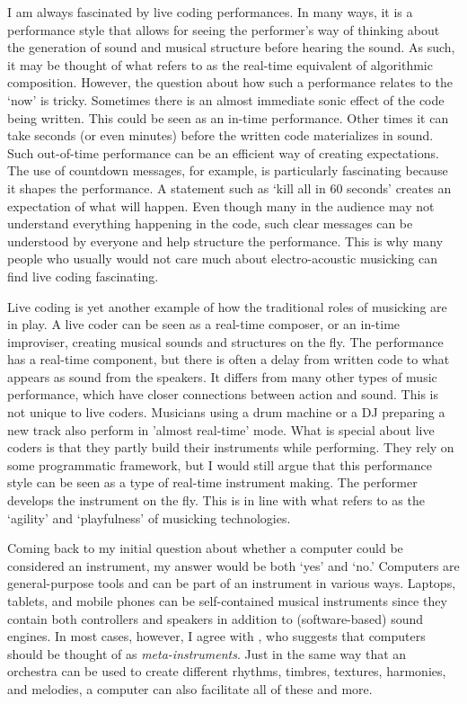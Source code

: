 I am always fascinated by live coding performances. In many ways, it is a performance style that allows for seeing the performer's way of thinking about the generation of sound and musical structure before hearing the sound. As such, it may be thought of what \citet{chadabe_electric_1997} refers to as the real-time equivalent of algorithmic composition. However, the question about how such a performance relates to the `now' is tricky. Sometimes there is an almost immediate sonic effect of the code being written. This could be seen as an in-time performance. Other times it can take seconds (or even minutes) before the written code materializes in sound. Such out-of-time performance can be an efficient way of creating expectations. The use of countdown messages, for example, is particularly fascinating because it shapes the performance. A statement such as `kill all in 60 seconds' creates an expectation of what will happen. Even though many in the audience may not understand everything happening in the code, such clear messages can be understood by everyone and help structure the performance. This is why many people who usually would not care much about electro-acoustic musicking can find live coding fascinating.

Live coding is yet another example of how the traditional roles of musicking are in play. A live coder can be seen as a real-time composer, or an in-time improviser, creating musical sounds and structures on the fly. The performance has a real-time component, but there is often a delay from written code to what appears as sound from the speakers. It differs from many other types of music performance, which have closer connections between action and sound. This is not unique to live coders. Musicians using a drum machine or a DJ preparing a new track also perform in 'almost real-time' mode. What is special about live coders is that they partly build their instruments while performing. They rely on some programmatic framework, but I would still argue that this performance style can be seen as a type of real-time instrument making. The performer develops the instrument on the fly. This is in line with what \citet{green_agility_2011} refers to as the `agility' and `playfulness' of musicking technologies.

Coming back to my initial question about whether a computer could be considered an instrument, my answer would be both `yes' and `no.' Computers are general-purpose tools and can be part of an instrument in various ways. Laptops, tablets, and mobile phones can be self-contained musical instruments since they contain both controllers and speakers in addition to (software-based) sound engines. In most cases, however, I agree with \citet{wang_artful_2018}, who suggests that computers should be thought of as \emph{meta-instruments}. Just in the same way that an orchestra can be used to create different rhythms, timbres, textures, harmonies, and melodies, a computer can also facilitate all of these and more.


